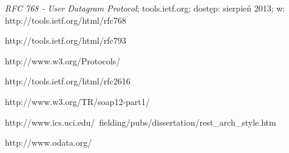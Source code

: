 \begin{thebibliography}{}

  \emph{RFC 768 - User Datagram Protocol};
  tools.ietf.org;
  dostęp: sierpień 2013;
  w: http://tools.ietf.org/html/rfc768
 
  http://tools.ietf.org/html/rfc793
 
  http://www.w3.org/Protocols/
 
  http://tools.ietf.org/html/rfc2616
 
  http://www.w3.org/TR/soap12-part1/
 
  http://www.ics.uci.edu/~fielding/pubs/dissertation/rest\_arch\_style.htm
 
  http://www.odata.org/
 
                
\end{thebibliography}
